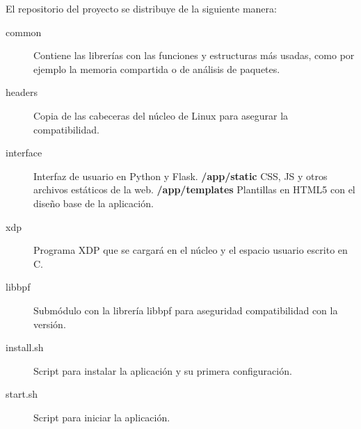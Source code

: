 El repositorio del proyecto se distribuye de la siguiente manera:
\begin{description}
  \item [common] Contiene las librerías con las funciones y estructuras más usadas, como por ejemplo la memoria compartida o de análisis de paquetes.
  \item [headers] Copia de las cabeceras del núcleo de Linux para asegurar la compatibilidad.
  \item [interface] Interfaz de usuario en Python y Flask.
    \subitem \textbf{/app/static} CSS, JS y otros archivos estáticos de la web.
    \subitem \textbf{/app/templates} Plantillas en HTML5 con el diseño base de la aplicación.
  \item [xdp] Programa XDP que se cargará en el núcleo y el espacio usuario escrito en C.
  \item [libbpf] Submódulo con la librería libbpf para aseguridad compatibilidad con la versión.
  \item [install.sh] Script para instalar la aplicación y su primera configuración.
  \item [start.sh] Script para iniciar la aplicación.
  
  
\end{description}
